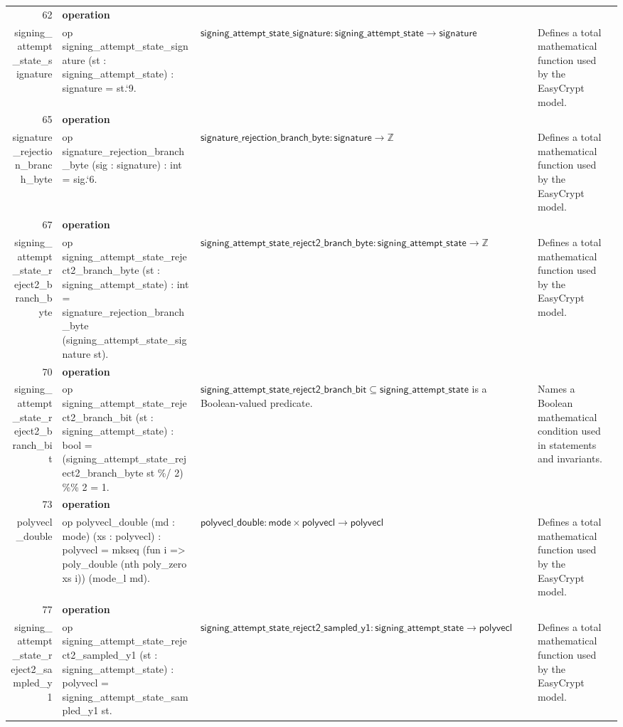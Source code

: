 \documentclass[10pt]{article}
\newcommand{\ec}[1]{\begingroup\ttfamily\scriptsize #1\endgroup}
\begin{document}
\begin{longtable}{r L{0.17\textwidth} L{0.26\textwidth} L{0.27\textwidth} L{0.20\textwidth}}
62 & \textbf{operation}\\\ec{signing\_attempt\_state\_signature} & \ec{op signing\_attempt\_state\_signature (st : signing\_attempt\_state) : signature = st.`9.} & \(\mathsf{signing\_attempt\_state\_signature} : \mathsf{signing\_attempt\_state} \to \mathsf{signature}\) & Defines a total mathematical function used by the EasyCrypt model. \\
65 & \textbf{operation}\\\ec{signature\_rejection\_branch\_byte} & \ec{op signature\_rejection\_branch\_byte (sig : signature) : int = sig.`6.} & \(\mathsf{signature\_rejection\_branch\_byte} : \mathsf{signature} \to \mathbb{Z}\) & Defines a total mathematical function used by the EasyCrypt model. \\
67 & \textbf{operation}\\\ec{signing\_attempt\_state\_reject2\_branch\_byte} & \ec{op signing\_attempt\_state\_reject2\_branch\_byte (st : signing\_attempt\_state) : int = signature\_rejection\_branch\_byte (signing\_attempt\_state\_signature st).} & \(\mathsf{signing\_attempt\_state\_reject2\_branch\_byte} : \mathsf{signing\_attempt\_state} \to \mathbb{Z}\) & Defines a total mathematical function used by the EasyCrypt model. \\
70 & \textbf{operation}\\\ec{signing\_attempt\_state\_reject2\_branch\_bit} & \ec{op signing\_attempt\_state\_reject2\_branch\_bit (st : signing\_attempt\_state) : bool = (signing\_attempt\_state\_reject2\_branch\_byte st \%/ 2) \%\% 2 = 1.} & \(\mathsf{signing\_attempt\_state\_reject2\_branch\_bit} \subseteq \mathsf{signing\_attempt\_state}\) is a Boolean-valued predicate. & Names a Boolean mathematical condition used in statements and invariants. \\
73 & \textbf{operation}\\\ec{polyvecl\_double} & \ec{op polyvecl\_double (md : mode) (xs : polyvecl) : polyvecl = mkseq (fun i => poly\_double (nth poly\_zero xs i)) (mode\_l md).} & \(\mathsf{polyvecl\_double} : \mathsf{mode} \times \mathsf{polyvecl} \to \mathsf{polyvecl}\) & Defines a total mathematical function used by the EasyCrypt model. \\
77 & \textbf{operation}\\\ec{signing\_attempt\_state\_reject2\_sampled\_y1} & \ec{op signing\_attempt\_state\_reject2\_sampled\_y1 (st : signing\_attempt\_state) : polyvecl = signing\_attempt\_state\_sampled\_y1 st.} & \(\mathsf{signing\_attempt\_state\_reject2\_sampled\_y1} : \mathsf{signing\_attempt\_state} \to \mathsf{polyvecl}\) & Defines a total mathematical function used by the EasyCrypt model. \\

\end{longtable}
\end{document}
